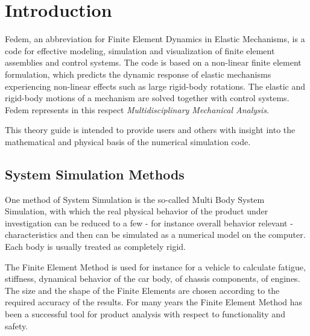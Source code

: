 %
%

%
%

\chapter{Introduction}


Fedem, an abbreviation for Finite Element Dynamics in Elastic Mechanisms,
is a code for effective modeling, simulation and visualization of finite element
assemblies and control systems. The code is based on a non-linear finite element
formulation, which predicts the dynamic response of elastic mechanisms
experiencing non-linear effects such as large rigid-body rotations.
The elastic and rigid-body motions of a mechanism are solved together
with control systems. Fedem represents in this respect
\textit{Multidisciplinary Mechanical Analysis}.

This theory guide is intended to provide users and others with insight into
the mathematical and physical basis of the numerical simulation code.



\section{System Simulation Methods}

One method of System Simulation is the so-called Multi Body System Simulation, with which 
the real physical behavior of the product under investigation can be reduced 
to a few - for instance overall behavior relevant - characteristics and then 
can be simulated as a numerical model on the computer. Each body is usually
treated as completely rigid.

The Finite Element Method is used for instance 
for a vehicle to calculate fatigue, stiffness, dynamical behavior of the car 
body, of chassis components, of engines.  
The size and the shape of the Finite Elements are chosen according to the
required accuracy of the results. For many years the Finite Element Method has 
been a successful tool for product analysis with respect to 
functionality and safety.

